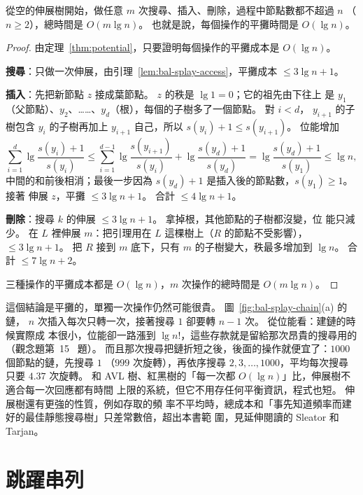\begin{theorem}
\label{thm:bal-splay}
從空的伸展樹開始，做任意 $m$ 次搜尋、插入、刪除，過程中節點數都不超過 $n$
（$n \ge 2$），總時間是 $O(m \lg n)$。 也就是說，每個操作的平攤時間是 $O(\lg n)$。
\end{theorem}

\begin{proof}
由定理~\ref{thm:potential}，只要證明每個操作的平攤成本是 $O(\lg n)$。

\textbf{搜尋}：只做一次伸展，由引理~\ref{lem:bal-splay-access}，平攤成本
$\le 3 \lg n + 1$。

\textbf{插入}：先把新節點 $z$ 接成葉節點。 $z$ 的秩是 $\lg 1 = 0$；它的祖先由下往上
是 $y_1$（父節點）、$y_2$、……、$y_d$（根），每個的子樹多了一個節點。 對 $i < d$，
$y_{i+1}$ 的子樹包含 $y_i$ 的子樹再加上 $y_{i+1}$ 自己，所以 $s(y_i) + 1 \le
s(y_{i+1})$。 位能增加
\[
\sum_{i=1}^{d} \lg \frac{s(y_i) + 1}{s(y_i)}
\le \sum_{i=1}^{d-1} \lg \frac{s(y_{i+1})}{s(y_i)} + \lg \frac{s(y_d) + 1}{s(y_d)}
= \lg \frac{s(y_d) + 1}{s(y_1)} \le \lg n ,
\]
中間的和前後相消；最後一步因為 $s(y_d) + 1$ 是插入後的節點數，$s(y_1) \ge 1$。 接著
伸展 $z$，平攤 $\le 3 \lg n + 1$。 合計 $\le 4 \lg n + 1$。

\textbf{刪除}：搜尋 $k$ 的伸展 $\le 3 \lg n + 1$。 拿掉根，其他節點的子樹都沒變，位
能只減少。 在 $L$ 裡伸展 $m$：把引理用在 $L$ 這棵樹上（$R$ 的節點不受影響），
$\le 3 \lg n + 1$。 把 $R$ 接到 $m$ 底下，只有 $m$ 的子樹變大，秩最多增加到
$\lg n$。 合計 $\le 7 \lg n + 2$。

三種操作的平攤成本都是 $O(\lg n)$，$m$ 次操作的總時間是 $O(m \lg n)$。
\end{proof}

這個結論是平攤的，單獨一次操作仍然可能很貴。 圖~\ref{fig:bal-splay-chain}(a) 的鏈，
$n$ 次插入每次只轉一次，接著搜尋 $1$ 卻要轉 $n - 1$ 次。 從位能看：建鏈的時候實際成
本很小，位能卻一路漲到 $\lg n!$，這些存款就是留給那次昂貴的搜尋用的（觀念題第~15~
題）。 而且那次搜尋把鏈折短之後，後面的操作就便宜了：$1000$ 個節點的鏈，先搜尋 $1$
（$999$ 次旋轉），再依序搜尋 $2, 3, \ldots, 1000$，平均每次搜尋只要 $4.37$ 次旋轉。 和 AVL 樹、紅黑樹的「每一次都 $O(\lg n)$」比，伸展樹不適合每一次回應都有時間
上限的系統，但它不用存任何平衡資訊，程式也短。 伸展樹還有更強的性質，例如存取的頻
率不平均時，總成本和「事先知道頻率而建好的最佳靜態搜尋樹」只差常數倍，超出本書範
圍，見延伸閱讀的 Sleator 和 Tarjan。

\section{跳躍串列}
\label{sec:bal-skip}

